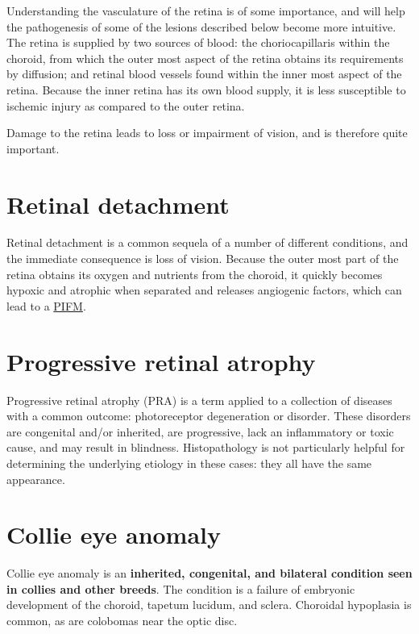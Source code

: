 \documentclass[openany]{book}
\begin{document}
Understanding the vasculature of the retina is of some importance, and
will help the pathogenesis of some of the lesions described below become
more intuitive. The retina is supplied by two sources of blood: the
choriocapillaris within the choroid, from which the outer most aspect of
the retina obtains its requirements by diffusion; and retinal blood
vessels found within the inner most aspect of the retina. Because the
inner retina has its own blood supply, it is less susceptible to
ischemic injury as compared to the outer retina.

Damage to the retina leads to loss or impairment of vision, and is
therefore quite important.

\hypertarget{retinal-detachment}{\section{Retinal
detachment}\label{retinal-detachment}}

Retinal detachment is a common sequela of a number of different
conditions, and the immediate consequence is loss of vision. Because the
outer most part of the retina obtains its oxygen and nutrients from the
choroid, it quickly becomes hypoxic and atrophic when separated and
releases angiogenic factors, which can lead to a
\protect\hyperlink{pre-iridial-fibrovascular-membranes-pifm}{PIFM}.

\section{Progressive retinal atrophy}\label{progressive-retinal-atrophy}

Progressive retinal atrophy (PRA) is a term applied to a collection of
diseases with a common outcome: photoreceptor degeneration or disorder.
These disorders are congenital and/or inherited, are progressive, lack
an inflammatory or toxic cause, and may result in blindness.
Histopathology is not particularly helpful for determining the
underlying etiology in these cases: they all have the same appearance.

\section{Collie eye anomaly}\label{collie-eye-anomaly}

Collie eye anomaly is an \textbf{inherited, congenital, and bilateral
condition seen in collies and other breeds}. The condition is a failure
of embryonic development of the choroid, tapetum lucidum, and sclera.
Choroidal hypoplasia is common, as are colobomas near the optic disc.
\end{document}
